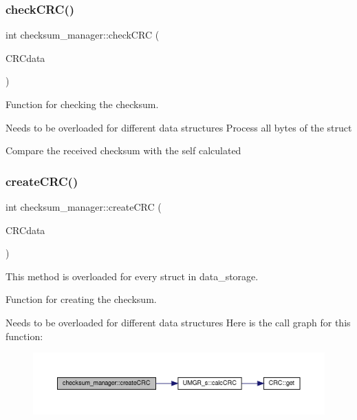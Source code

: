 \subsubsection{\texorpdfstring{check\+C\+R\+C()}{checkCRC()}\hspace{0.1cm}{\footnotesize\ttfamily [2/2]}}
{\footnotesize\ttfamily int checksum\+\_\+manager\+::check\+C\+RC (\begin{DoxyParamCaption}\item[{\hyperlink{structEXMPLE__s}{E\+X\+M\+P\+L\+E\+\_\+s} $\ast$}]{C\+R\+Cdata }\end{DoxyParamCaption})}



Function for checking the checksum. 

Needs to be overloaded for different data structures Process all bytes of the struct

Compare the received checksum with the self calculated \mbox{\label{classchecksum__manager_a31afd631fa3668a1dfd08ee0b8807d16}} 
\subsubsection{\texorpdfstring{create\+C\+R\+C()}{createCRC()}\hspace{0.1cm}{\footnotesize\ttfamily [1/2]}}
{\footnotesize\ttfamily int checksum\+\_\+manager\+::create\+C\+RC (\begin{DoxyParamCaption}\item[{\hyperlink{structUMGR__s}{U\+M\+G\+R\+\_\+s} $\ast$}]{C\+R\+Cdata }\end{DoxyParamCaption})}



This method is overloaded for every struct in data\+\_\+storage. 

Function for creating the checksum.

Needs to be overloaded for different data structures Here is the call graph for this function\+:
\nopagebreak
\begin{figure}[H]
\begin{center}
\leavevmode
\includegraphics[width=350pt]{classchecksum__manager_a31afd631fa3668a1dfd08ee0b8807d16_cgraph}
\end{center}
\end{figure}
\mbox{\label{classchecksum__manager_a613cc124da07b2f7d002eefb2065a2e3}} 
